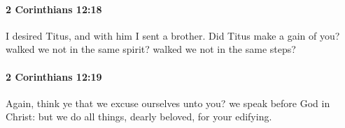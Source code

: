 		\paragraph{2 Corinthians 12:18} %
			\label{2CORINTHIANS-12-18}

			I desired Titus, and with him I sent a brother.  Did Titus make a gain of you?  walked we not in the same spirit?  walked we not in the same steps?

			\begin{framed}
			\scriptsize
				\begin{compactdesc}
					\item[SBLG] 
				\end{compactdesc}
			\end{framed}

		\paragraph{2 Corinthians 12:19} %
			\label{2CORINTHIANS-12-19}

			Again, think ye that we excuse ourselves unto you?  we speak before God in Christ: but we do all things, dearly beloved, for your edifying.

